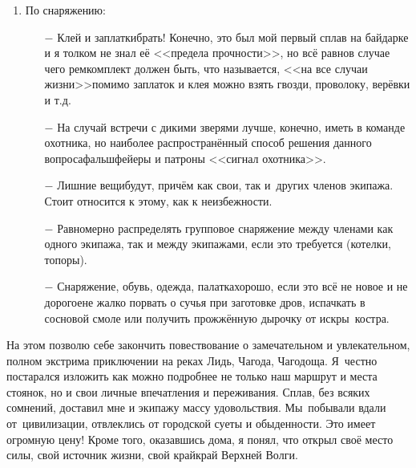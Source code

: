 \begin{enumerate}
		\begin{enumerate}
		\setlength{\itemindent}{0em}
		\item [$-$] С особой тщательностью следует подбирать экипажи и только в самых крайних случаях идти с~малознакомыми людьми. Про незнакомых я вообще молчу\mdash этого, по возможности, следует избегать. Исключение\mdash всякие коммерческие сплавы.
		\item [$-$] На трёхместных байдарках физически сильных гребцов следует размещать на корме и носу\mdash так проще управлять байдаркой и совершать маневрирование. 
	\end{enumerate}
	\item По снаряжению:
	\begin{enumerate}
		\setlength{\itemindent}{0em}
		\item [$-$] Клей и заплатки\mdash брать! Конечно, это был мой первый сплав на байдарке и я толком не знал её <<предела прочности>>, но всё равно\mdash в случае чего ремкомплект должен быть, что называется, <<на все случаи жизни>>\mdash помимо заплаток и клея можно взять гвозди, проволоку, верёвки и т.д.
		\item [$-$] На случай встречи с дикими зверями лучше, конечно, иметь в команде охотника, но наиболее распространённый способ решения данного вопроса\mdash фальшфейеры и патроны <<сигнал охотника>>.
		\item [$-$] Лишние вещи\mdash будут, причём как свои, так и~других членов экипажа. Стоит относится к этому, как к неизбежности.
		\item [$-$] Равномерно распределять групповое снаряжение между членами как одного экипажа, так и между экипажами, если это требуется (котелки, топоры).
		\item [$-$] Снаряжение, обувь, одежда, палатка\mdash хорошо, если это всё не новое и не дорогое\mdash не жалко порвать о сучья при заготовке дров, испачкать в сосновой смоле или получить прожжённую дырочку от искры~костра.
	\end{enumerate}
\end{enumerate}

На этом позволю себе закончить повествование о замечательном и увлекательном, полном экстрима приключении на реках Лидь, Чагода, Чагодоща. Я~честно постарался изложить как можно подробнее не только наш маршрут и места стоянок, но и свои личные впечатления и переживания. Сплав, без всяких сомнений, доставил мне и экипажу массу удовольствия. Мы~побывали вдали от~цивилизации, отвлеклись от городской суеты и обыденности. Это имеет огромную цену! Кроме того, оказавшись дома, я понял, что открыл своё место силы, свой источник жизни, свой край\mdash край Верхней Волги.


